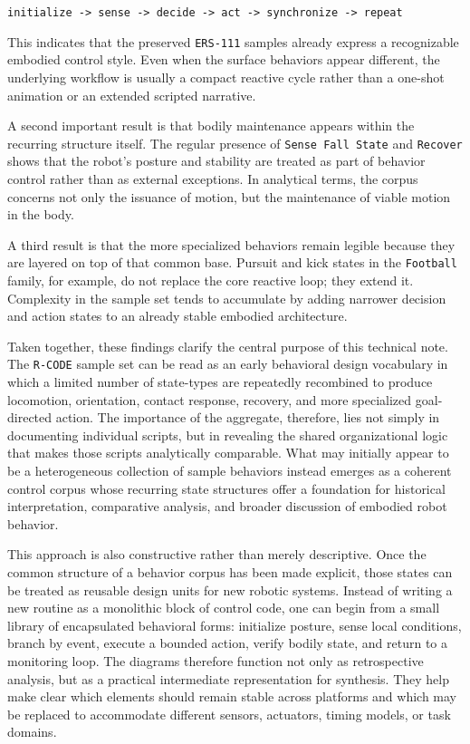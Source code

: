 \documentclass[11pt]{article}
\begin{document}
\begin{center}
\texttt{initialize -> sense -> decide -> act -> synchronize -> repeat}
\end{center}

This indicates that the preserved \texttt{ERS-111} samples already
express a recognizable embodied control style. Even when the surface
behaviors appear different, the underlying workflow is usually a
compact reactive cycle rather than a one-shot animation or an extended
scripted narrative.

A second important result is that bodily maintenance appears within the
recurring structure itself. The regular presence of \texttt{Sense Fall
State} and \texttt{Recover} shows that the robot's posture and
stability are treated as part of behavior control rather than as
external exceptions. In analytical terms, the corpus concerns not only
the issuance of motion, but the maintenance of viable motion in the
body.

A third result is that the more specialized behaviors remain legible
because they are layered on top of that common base. Pursuit and kick
states in the \texttt{Football} family, for example, do not replace the
core reactive loop; they extend it. Complexity in the sample set tends
to accumulate by adding narrower decision and action states to an
already stable embodied architecture.

Taken together, these findings clarify the central purpose of this
technical note. The \texttt{R-CODE} sample set can be read as an early
behavioral design vocabulary in which a limited number of state-types
are repeatedly recombined to produce locomotion, orientation, contact
response, recovery, and more specialized goal-directed action. The
importance of the aggregate, therefore, lies not simply in documenting
individual scripts, but in revealing the shared organizational logic
that makes those scripts analytically comparable. What may initially
appear to be a heterogeneous collection of sample behaviors instead
emerges as a coherent control corpus whose recurring state structures
offer a foundation for historical interpretation, comparative
analysis, and broader discussion of embodied robot behavior.

This approach is also constructive rather than merely descriptive.
Once the common structure of a behavior corpus has been made explicit,
those states can be treated as reusable design units for new robotic
systems. Instead of writing a new routine as a monolithic block of
control code, one can begin from a small library of encapsulated
behavioral forms: initialize posture, sense local conditions, branch by
event, execute a bounded action, verify bodily state, and return to a
monitoring loop. The diagrams therefore function not only as
retrospective analysis, but as a practical intermediate representation
for synthesis. They help make clear which elements should remain stable
across platforms and which may be replaced to accommodate different
sensors, actuators, timing models, or task domains.
\end{document}
